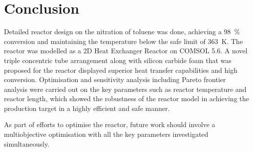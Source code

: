 \section{Conclusion} \label{sec:conclusion}
Detailed reactor design on the nitration of toluene was done, achieving a \SI{98}{\%} conversion and maintaining the temperature below the safe limit of \SI{363}{\K}. The reactor was modelled as a 2D Heat Exchanger Reactor on COMSOL 5.6. A novel triple concentric tube arrangement along with silicon carbide foam that was proposed for the reactor displayed superior heat transfer capabilities and high conversion. Optimisation and sensitivity analysis including Pareto frontier analysis were carried out on the key parameters such as reactor temperature and reactor length, which showed the robustness of the reactor model in achieving the production target in a highly efficient and safe manner.  

As part of efforts to optimise the reactor, future work should involve a multiobjective optimisation with all the key parameters investigated simultaneously. 


